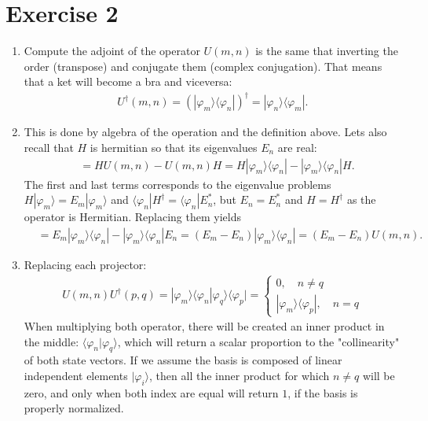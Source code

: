 \documentclass[letterpaper,11pt,twoside]{article}
\begin{document}
\section{Exercise 2}
\begin{enumerate}[itemsep=0pt,topsep=0pt,label=\alph*.]
  \item Compute the adjoint of the operator $U(m,n)$ is the same that inverting the order (transpose) and conjugate them (complex conjugation).
  That means that a ket will become a bra and viceversa: 
  \begin{align}
    U^\dagger(m,n)=(|\varphi_m\rangle\langle\varphi_n|)^\dagger=|\varphi_n\rangle\langle \varphi_m|.
    \label{eq:udagger}
  \end{align}
  \item This is done by algebra of the operation and the definition above. Lets also
  recall that $H$ is hermitian so that its eigenvalues $E_n$ are real:
  \begin{align*}
    [H,U(m,n)]&=HU(m,n)-U(m,n)H=H|\varphi_m\rangle\langle\varphi_n|-|\varphi_m\rangle\langle\varphi_n|H.
  \end{align*}
  The first and last terms corresponds to the eigenvalue problems $H|\varphi_m\rangle=E_m|\varphi_m\rangle$ and $\langle\varphi_n|H^\dagger=\langle\varphi_n|E^*_n$, but 
  $E_n=E^*_n$ and $H=H^\dagger$ as the operator is Hermitian. Replacing them yields
  \begin{align*}
    [H,U(m,n)]&=E_m|\varphi_m\rangle\langle\varphi_n|-|\varphi_m\rangle \langle\varphi_ n|E_n=(E_m-E_n)|\varphi_m\rangle \langle\varphi_ n|=(E_m-E_n)U(m,n).
  \end{align*}
  \item Replacing each projector:
  \begin{align*}
    U(m,n)U^\dagger (p,q)=|\varphi_m\rangle\langle\varphi_n|\varphi_q\rangle\langle\varphi_p|=\begin{cases}
      0,\quad n\neq q\\
      |\varphi_m\rangle\langle\varphi_p|,\quad n=q
    \end{cases}
  \end{align*}
  When multiplying both operator, there will be created an inner product in the middle: $\langle\varphi_n|\varphi_q\rangle$, which 
  will return a scalar proportion to the "collinearity" of both state vectors. If we assume the basis is composed of linear independent elements $|\varphi_i\rangle$,
  then all the inner product for which $n\neq q$ will be zero, and only when both index are equal will return $1$, if the basis is properly normalized.

\end{enumerate}
\end{document}
